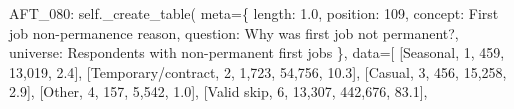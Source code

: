 \documentclass[
  11pt,
  a4paper,
]{article}
\newenvironment{Shaded}{\begin{snugshade}}{\end{snugshade}}
\newcommand{\NormalTok}[1]{\textcolor[rgb]{0.00,0.23,0.31}{#1}}
\newcommand{\OperatorTok}[1]{\textcolor[rgb]{0.37,0.37,0.37}{#1}}
\newcommand{\StringTok}[1]{\textcolor[rgb]{0.13,0.47,0.30}{#1}}
\newcommand{\VariableTok}[1]{\textcolor[rgb]{0.07,0.07,0.07}{#1}}
\begin{document}
\begin{Shaded}
\begin{Highlighting}[]
            \StringTok{\textquotesingle{}AFT\_080\textquotesingle{}}\NormalTok{: }\VariableTok{self}\NormalTok{.\_create\_table(}
\NormalTok{                meta}\OperatorTok{=}\NormalTok{\{}
                    \StringTok{\textquotesingle{}length\textquotesingle{}}\NormalTok{: }\StringTok{\textquotesingle{}1.0\textquotesingle{}}\NormalTok{, }\StringTok{\textquotesingle{}position\textquotesingle{}}\NormalTok{: }\StringTok{\textquotesingle{}109\textquotesingle{}}\NormalTok{,}
                    \StringTok{\textquotesingle{}concept\textquotesingle{}}\NormalTok{: }\StringTok{\textquotesingle{}First job non{-}permanence reason\textquotesingle{}}\NormalTok{,}
                    \StringTok{\textquotesingle{}question\textquotesingle{}}\NormalTok{: }\StringTok{\textquotesingle{}Why was first job not permanent?\textquotesingle{}}\NormalTok{,}
                    \StringTok{\textquotesingle{}universe\textquotesingle{}}\NormalTok{: }\StringTok{\textquotesingle{}Respondents with non{-}permanent first jobs\textquotesingle{}}
\NormalTok{                \},}
\NormalTok{                data}\OperatorTok{=}\NormalTok{[}
\NormalTok{                    [}\StringTok{\textquotesingle{}Seasonal\textquotesingle{}}\NormalTok{, }\StringTok{\textquotesingle{}1\textquotesingle{}}\NormalTok{, }\StringTok{\textquotesingle{}459\textquotesingle{}}\NormalTok{, }\StringTok{\textquotesingle{}13,019\textquotesingle{}}\NormalTok{, }\StringTok{\textquotesingle{}2.4\textquotesingle{}}\NormalTok{],}
\NormalTok{                    [}\StringTok{\textquotesingle{}Temporary/contract\textquotesingle{}}\NormalTok{, }\StringTok{\textquotesingle{}2\textquotesingle{}}\NormalTok{, }\StringTok{\textquotesingle{}1,723\textquotesingle{}}\NormalTok{, }\StringTok{\textquotesingle{}54,756\textquotesingle{}}\NormalTok{, }\StringTok{\textquotesingle{}10.3\textquotesingle{}}\NormalTok{],}
\NormalTok{                    [}\StringTok{\textquotesingle{}Casual\textquotesingle{}}\NormalTok{, }\StringTok{\textquotesingle{}3\textquotesingle{}}\NormalTok{, }\StringTok{\textquotesingle{}456\textquotesingle{}}\NormalTok{, }\StringTok{\textquotesingle{}15,258\textquotesingle{}}\NormalTok{, }\StringTok{\textquotesingle{}2.9\textquotesingle{}}\NormalTok{],}
\NormalTok{                    [}\StringTok{\textquotesingle{}Other\textquotesingle{}}\NormalTok{, }\StringTok{\textquotesingle{}4\textquotesingle{}}\NormalTok{, }\StringTok{\textquotesingle{}157\textquotesingle{}}\NormalTok{, }\StringTok{\textquotesingle{}5,542\textquotesingle{}}\NormalTok{, }\StringTok{\textquotesingle{}1.0\textquotesingle{}}\NormalTok{],}
\NormalTok{                    [}\StringTok{\textquotesingle{}Valid skip\textquotesingle{}}\NormalTok{, }\StringTok{\textquotesingle{}6\textquotesingle{}}\NormalTok{, }\StringTok{\textquotesingle{}13,307\textquotesingle{}}\NormalTok{, }\StringTok{\textquotesingle{}442,676\textquotesingle{}}\NormalTok{, }\StringTok{\textquotesingle{}83.1\textquotesingle{}}\NormalTok{],}

\end{Highlighting}
\end{Shaded}
\end{document}
